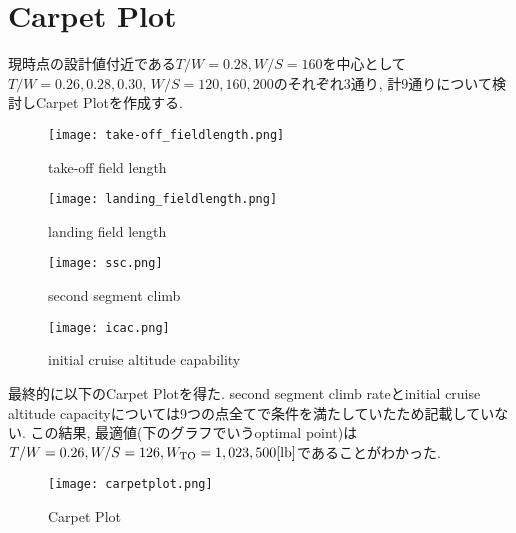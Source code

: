 \documentclass[12pt]{jsarticle}
\begin{document}
\section{Carpet Plot}
現時点の設計値付近である$T/W = 0.28, W/S = 160$を中心として$T/W = 0.26, 0.28, 0.30$, $W/S = 120, 160, 200$のそれぞれ3通り, 計9通りについて検討しCarpet Plotを作成する.
\begin{figure}[H]
 \begin{minipage}{0.5\hsize}
  \begin{center}
   \texttt{[image: take-off\_fieldlength.png]}
  \end{center}
  \caption{take-off field length}
  \label{fig:one}
 \end{minipage}
 \begin{minipage}{0.5\hsize}
  \begin{center}
   \texttt{[image: landing\_fieldlength.png]}
  \end{center}
  \caption{landing field length}
  \label{fig:two}
 \end{minipage}
\end{figure}
\begin{figure}[H]
 \begin{minipage}{0.5\hsize}
  \begin{center}
   \texttt{[image: ssc.png]}
  \end{center}
  \caption{second segment climb}
  \label{fig:one}
 \end{minipage}
 \begin{minipage}{0.5\hsize}
  \begin{center}
   \texttt{[image: icac.png]}
  \end{center}
  \caption{initial cruise altitude capability}
  \label{fig:two}
 \end{minipage}
\end{figure}
最終的に以下のCarpet Plotを得た. second segment climb rateとinitial cruise altitude capacityについては9つの点全てで条件を満たしていたため記載していない. この結果, 最適値(下のグラフでいうoptimal point)は$T/W = 0.26, W/S = 126, W_{\rm TO} = 1,023,500[\rm lb]$であることがわかった.
\begin{figure}[H]
\begin{center}
\texttt{[image: carpetplot.png]}
\caption{Carpet Plot}
\end{center}
\end{figure}
\end{document}
